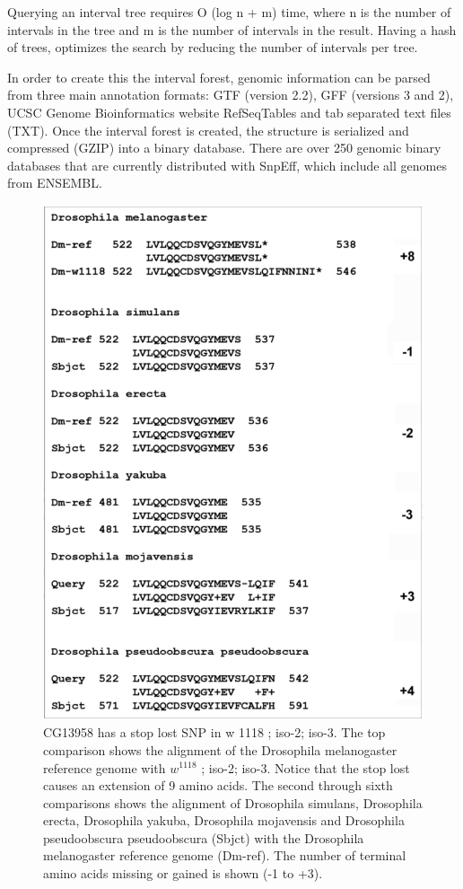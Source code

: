 Querying an interval tree requires O (log n + m) time, where n is the number of intervals in the tree and m is the number of intervals in the result. Having a hash of trees, optimizes the search by reducing the number of intervals per tree.

In order to create this the interval forest, genomic information can be parsed from three main annotation formats: GTF (version 2.2), GFF (versions 3 and 2), UCSC Genome Bioinformatics website RefSeqTables and tab separated text files (TXT). Once the interval forest is created, the structure is serialized and compressed (GZIP) into a binary database. There are over 250 genomic binary databases that are currently distributed with SnpEff, which include all genomes from ENSEMBL.

\begin{figure}
    \centering
    \includegraphics[width=14cm]{snpeff_fig5.png}
    \caption{CG13958 has a stop lost SNP in w 1118 ; iso-2; iso-3. The top comparison shows the alignment of the Drosophila melanogaster reference genome with $w^{1118}$ ; iso-2; iso-3. Notice that the stop lost causes an extension of 9 amino acids. The second through sixth comparisons shows the alignment of Drosophila simulans, Drosophila erecta, Drosophila yakuba, Drosophila mojavensis and Drosophila pseudoobscura pseudoobscura (Sbjct) with the Drosophila melanogaster reference genome (Dm-ref). The number of terminal amino acids missing or gained is shown (-1 to +3). }
    \label{fig:snpeffTab3}
\end{figure}

